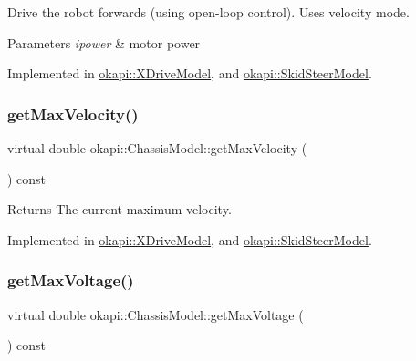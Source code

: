 Drive the robot forwards (using open-\/loop control). Uses velocity mode.


\begin{DoxyParams}{Parameters}
{\em ipower} & motor power \\
\hline
\end{DoxyParams}


Implemented in \mbox{\hyperlink{classokapi_1_1XDriveModel_a2a26c9bd57c26ca0251040a14272226c}{okapi\+::\+X\+Drive\+Model}}, and \mbox{\hyperlink{classokapi_1_1SkidSteerModel_a74ca9d9f1b0f80c9453194567c58e967}{okapi\+::\+Skid\+Steer\+Model}}.

\mbox{\label{classokapi_1_1ChassisModel_ab45dd7430636ed1c1dee25dae6df5d46}} 
\subsubsection{\texorpdfstring{getMaxVelocity()}{getMaxVelocity()}}
{\footnotesize\ttfamily virtual double okapi\+::\+Chassis\+Model\+::get\+Max\+Velocity (\begin{DoxyParamCaption}{ }\end{DoxyParamCaption}) const\hspace{0.3cm}{\ttfamily [pure virtual]}}

\begin{DoxyReturn}{Returns}
The current maximum velocity. 
\end{DoxyReturn}


Implemented in \mbox{\hyperlink{classokapi_1_1XDriveModel_aa5b5c3431c99c612ade5c97858478828}{okapi\+::\+X\+Drive\+Model}}, and \mbox{\hyperlink{classokapi_1_1SkidSteerModel_a7e2fcfb65e940ea4d71780966b4b5b68}{okapi\+::\+Skid\+Steer\+Model}}.

\mbox{\label{classokapi_1_1ChassisModel_a3ced2121524ae523592db64733c69472}} 
\subsubsection{\texorpdfstring{getMaxVoltage()}{getMaxVoltage()}}
{\footnotesize\ttfamily virtual double okapi\+::\+Chassis\+Model\+::get\+Max\+Voltage (\begin{DoxyParamCaption}{ }\end{DoxyParamCaption}) const\hspace{0.3cm}{\ttfamily [pure virtual]}}

